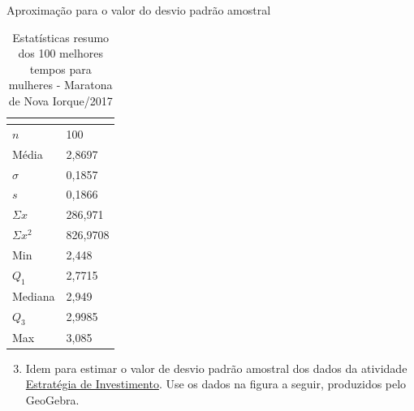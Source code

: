 {\begin{task}{Aproximação para o valor do desvio padrão amostral}
\begin{table}[H]
\centering
\begin{tabular}{|l|l|}
\hline
\multicolumn{2}{|c|}{\cellcolor{\currentcolor!80}{\textcolor{white}{\textbf{Estatística}}}}\\
\hline
$n$ & 100 \\
\hline
Média & 2,8697 \\
\hline
$\sigma$ & 0,1857 \\
\hline
$s$ & 0,1866 \\
\hline
$\Sigma x$ & 286,971 \\
\hline
$\Sigma x^2$ & 826,9708 \\
\hline
Min & 2,448 \\
\hline
$Q_1$ & 2,7715 \\
\hline
Mediana & 2,949 \\
\hline
$Q_3$ & 2,9985 \\
\hline
Max & 3,085 \\
\hline
\end{tabular}
\caption{Estatísticas resumo dos 100 melhores tempos para mulheres - Maratona de Nova Iorque/2017}\label{\detokenize{PE104-5:fig-summarymaratonamulheres}}\label{\detokenize{PE104-5:id3}}
\end{table}

\begin{enumerate}
\setcounter{enumi}{2}
\item {} 
Idem para estimar o valor de desvio padrão amostral dos dados da atividade \hyperref[\detokenize{PE104-3:ativ-estrategia-de-investimento}]{Estratégia de Investimento}. Use os dados na figura a seguir, produzidos pelo GeoGebra.

\end{enumerate}


\end{task}}
